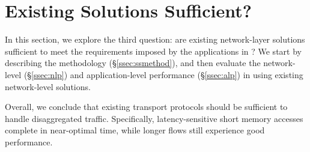 \section{Existing Solutions Sufficient?}
\label{sec:existing}
In this section, we explore the third question: are existing network-layer solutions sufficient to meet the requirements imposed by the applications in \dis? We start by describing the methodology (\S\ref{ssec:ssmethod}), and then evaluate the network-level (\S\ref{ssec:nlp}) and application-level performance (\S\ref{ssec:alp}) in \dis using existing network-level solutions.

Overall, we conclude that existing transport protocols should be sufficient to handle disaggregated traffic. Specifically, latency-sensitive short memory accesses complete in near-optimal time, while longer flows still experience good performance.

